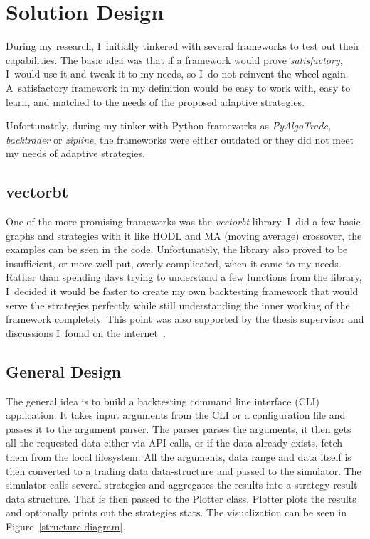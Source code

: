 \section{Solution Design}
During my research, I~initially tinkered with several frameworks to test out their capabilities. The basic idea was that if a framework would prove \emph{satisfactory}, I~would use it and tweak it to my needs, so I~do not reinvent the wheel again. A~satisfactory framework in my definition would be easy to work with, easy to learn, and matched to the needs of the proposed adaptive strategies.

Unfortunately, during my tinker with Python frameworks as \emph{PyAlgoTrade}, \emph{backtrader} or \emph{zipline}, the frameworks were either outdated or they did not meet my needs of adaptive strategies.

\subsection*{vectorbt}
One of the more promising frameworks was the \emph{vectorbt} library. I~did a few basic graphs and strategies with it like HODL and MA (moving average) crossover, the examples can be seen in the code. Unfortunately, the library also proved to be insufficient, or more well put, overly complicated, when it came to my needs. Rather than spending days trying to understand a few functions from the library, I~decided it would be faster to create my own backtesting framework that would serve the strategies perfectly while still understanding the inner working of the framework completely. This point was also supported by the thesis supervisor and discussions I~found on the internet~\cite{reddit:custom-backtester}.

\subsection*{General Design}
The general idea is to build a backtesting command line interface (CLI) application. It takes input arguments from the CLI or a configuration file and passes it to the argument parser. The parser parses the arguments, it then gets all the requested data either via API calls, or if the data already exists, fetch them from the local filesystem. All the arguments, data range and data itself is then converted to a trading data data-structure and passed to the simulator. The simulator calls several strategies and aggregates the results into a strategy result data structure. That is then passed to the Plotter class. Plotter plots the results and optionally prints out the strategies stats. The visualization can be seen in Figure~\ref{structure-diagram}.

